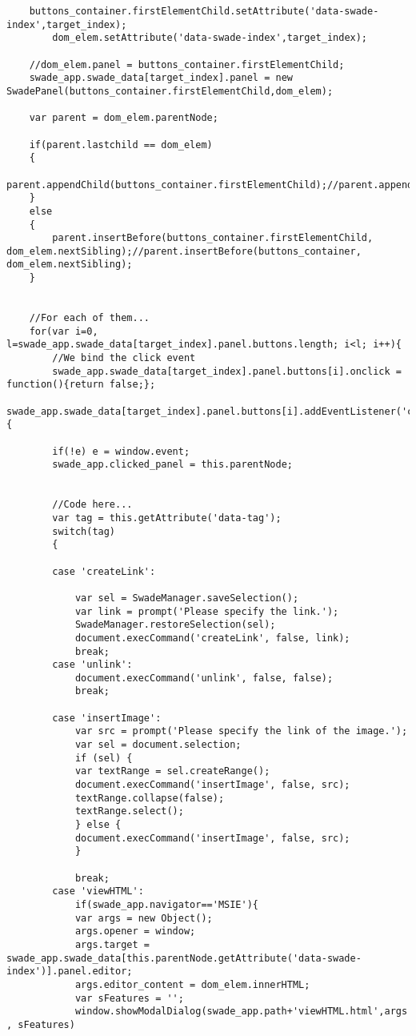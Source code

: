 \begin{lstlisting}
	buttons_container.firstElementChild.setAttribute('data-swade-index',target_index);
        dom_elem.setAttribute('data-swade-index',target_index);

	//dom_elem.panel = buttons_container.firstElementChild; 
	swade_app.swade_data[target_index].panel = new SwadePanel(buttons_container.firstElementChild,dom_elem);

	var parent = dom_elem.parentNode;

	if(parent.lastchild == dom_elem)
	{
	    parent.appendChild(buttons_container.firstElementChild);//parent.appendChild(buttons_container);
	}
	else
	{
	    parent.insertBefore(buttons_container.firstElementChild, dom_elem.nextSibling);//parent.insertBefore(buttons_container, dom_elem.nextSibling);
	}


	//For each of them...
	for(var i=0, l=swade_app.swade_data[target_index].panel.buttons.length; i<l; i++){
	    //We bind the click event
	    swade_app.swade_data[target_index].panel.buttons[i].onclick = function(){return false;};
	    swade_app.swade_data[target_index].panel.buttons[i].addEventListener('click',function(e){
		
		if(!e) e = window.event;
		swade_app.clicked_panel = this.parentNode;


		//Code here...
		var tag = this.getAttribute('data-tag');
		switch(tag)
		{

		case 'createLink':

		    var sel = SwadeManager.saveSelection();
		    var link = prompt('Please specify the link.');
		    SwadeManager.restoreSelection(sel);
		    document.execCommand('createLink', false, link);
		    break;
		case 'unlink':
		    document.execCommand('unlink', false, false);
		    break;
		    
		case 'insertImage':
		    var src = prompt('Please specify the link of the image.');
		    var sel = document.selection;
		    if (sel) {
			var textRange = sel.createRange();
			document.execCommand('insertImage', false, src);
			textRange.collapse(false);
			textRange.select();
		    } else {
			document.execCommand('insertImage', false, src);
		    }

		    break;
		case 'viewHTML':
		    if(swade_app.navigator=='MSIE'){
			var args = new Object(); 
			args.opener = window;
			args.target = swade_app.swade_data[this.parentNode.getAttribute('data-swade-index')].panel.editor;
			args.editor_content = dom_elem.innerHTML;
			var sFeatures = '';
			window.showModalDialog(swade_app.path+'viewHTML.html',args , sFeatures)
			

\end{lstlisting}

